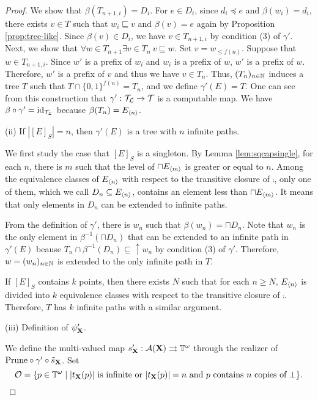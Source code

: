 \documentclass{eptcs-modified}
\begin{document}
\begin{theorem}
\begin{proof}
We show that  $\beta(T_{n+1,i}) = D_i$.  For $e \in D_i$, since $d_i \preceq e$ and $\beta(w_i) = d_i$,
there exists $v \in T$ such that $w_i \sqsubseteq v$ and $\beta(v) = e$ again by Proposition \ref{prop:tree-like}.
Since $\beta(v)  \in D_i$, we have $v \in T_{n+1, i}$ by condition (3) of $\gamma'$.  Next, we show that
$\forall w \in T_{n+1} \exists v \in T_n\  v \sqsubseteq w$.    Set $v = w_{\leq f(n)}$.
Suppose that $w \in T_{n+1, i}$.
Since $w'$ is a prefix of $w_i$ and $w_i$ is a prefix of $w$, $w'$ is a prefix of $w$.
Therefore, $w'$ is a prefix of $v$ and thus we have $v \in T_n$.
Thus, $(T_n)_{n \in \mathbb{N}}$ induces a
  tree $T$ such that $T \cap \{0,1\}^{f(n)} = T_n$, and we define $\gamma'(E) = T$.
One can see from this construction that
  $\gamma': \mathcal{T}_\mathcal{L} \to \mathcal{T}$ is a computable map.
We have  $\beta \circ \gamma' = \textrm{id}_{\mathcal{T}_\mathcal{L}}$ because $\beta(T_n) = {{E_{{\langle n\rangle}}}}$.

(ii) If $|[E]_S| = n$, then $\gamma'(E)$ is a tree with $n$ infinite paths.

We first study the case that $[E]_S$ is a singleton.
By Lemma \ref{lem:sqcapsingle}, for each $n$, there is $m$ such that the level of $\sqcap {{E_{{\langle m\rangle}}}}$ is greater or equal to $n$.
Among the equivalence classes of ${{E_{{\langle n\rangle}}}}$
with respect to the transitive closure of $\comp$, only one of them, which we call $D_n \subseteq {{E_{{\langle n\rangle}}}}$, contains an element less than $\sqcap {{E_{{\langle m\rangle}}}}$.  It means that
only elements in $D_n$ can be extended to infinite paths.

From the definition of $\gamma'$,  there is $w_n$ such that $\beta(w_n) = \sqcap D_n$.
Note that $w_n$ is the only element in $\beta^{-1}(\sqcap D_n)$ that can be extended to an infinite path in $\gamma'(E)$
beause $T_n \cap \beta^{-1}(D_n) \subseteq \uparrow w_n$ by condition (3) of $\gamma'$.
Therefore, $w = (w_n)_{n \in \mathbb{N}}$ is extended to the only infinite path in $T$.


If $[E]_S$ contains $k$ points, then there exists $N$ such that for each $n \geq N$,
${{E_{{\langle n\rangle}}}}$ is divided into $k$ equivalence classes  with respect to the transitive closure of $\comp$.  Therefore, $T$ has $k$ infinite paths with a similar argument.


(iii) Definition of $\psi'_{\mathbf{X}}$.

We define the multi-valued map $s_{\mathbf{X}}' : \mathcal{A}(\mathbf{X}) \rightrightarrows \mathbb{T}^\omega$ through  the realizer of $\textrm{Prune} \circ \gamma' \circ \tilde{s}_{\mathbf{X}}$.  Set
$${\cal O} = \{p \in \mathbb{T}^\omega \mid \mbox{$|t_{\mathbf{X}} (p)|$ is infinite or
$|t_{\mathbf{X}} (p)| = n$ and $p$ contains $n$ copies of $\bot$} \}.$$


\end{proof}
\end{theorem}
\end{document}
